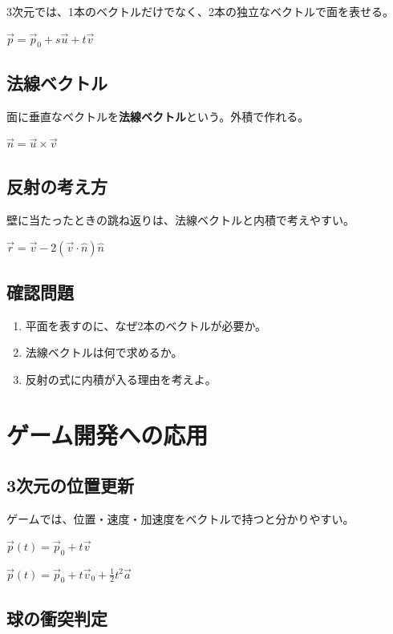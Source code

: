 \documentclass[paper=a4,fleqn]{jlreq}
\newcommand{\formula}[1]{%
  \vspace{4pt}%
  \begin{center}{\large\bfseries\boldmath\(\displaystyle #1\)}\end{center}%
  \vspace{4pt}%
}
\begin{document}
3次元では、1本のベクトルだけでなく、2本の独立なベクトルで面を表せる。

\formula{\vec{p}=\vec{p}_0+s\vec{u}+t\vec{v}}

\subsection{法線ベクトル}

面に垂直なベクトルを\textbf{法線ベクトル}という。外積で作れる。

\formula{\vec{n}=\vec{u}\times\vec{v}}

\subsection{反射の考え方}

壁に当たったときの跳ね返りは、法線ベクトルと内積で考えやすい。

\formula{\vec{r}=\vec{v}-2(\vec{v}\cdot\hat{n})\hat{n}}

\subsection{確認問題}
\begin{enumerate}
  \item 平面を表すのに、なぜ2本のベクトルが必要か。
  \item 法線ベクトルは何で求めるか。
  \item 反射の式に内積が入る理由を考えよ。
\end{enumerate}

\section{ゲーム開発への応用}

\subsection{3次元の位置更新}

ゲームでは、位置・速度・加速度をベクトルで持つと分かりやすい。

\formula{\vec{p}(t)=\vec{p}_0+t\vec{v}}

\formula{\vec{p}(t)=\vec{p}_0+t\vec{v}_0+\frac12t^2\vec{a}}

\subsection{球の衝突判定}
\end{document}
